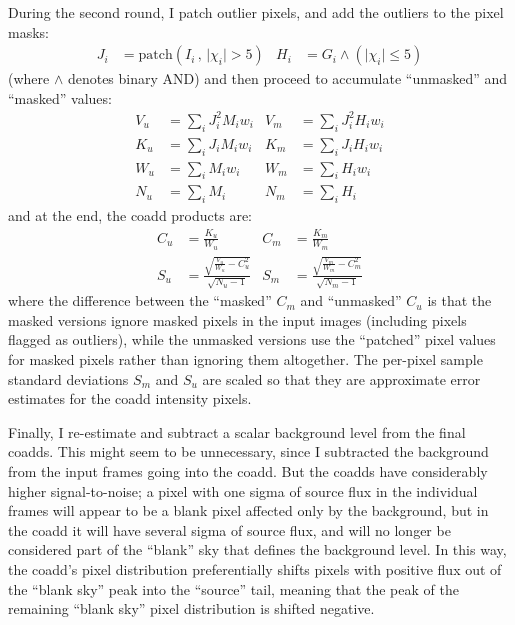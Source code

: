 \documentclass[11pt,preprint]{aastex}
\newcommand{\fimg}[1]{#1}
\newcommand{\img}{\fimg{I}}
\newcommand{\wt}{w}
\newcommand{\mask}{\fimg{M}}
\newcommand{\good}{\fimg{G}}
\newcommand{\covar}{\fimg{V}}
\newcommand{\coacc}{\fimg{K}}
\newcommand{\coadd}{\fimg{C}}
\newcommand{\cowt}{\fimg{W}}
\newcommand{\con}{\fimg{N}}
\newcommand{\copp}{\fimg{S}}
\newcommand{\sgood}{\fimg{H}}
\newcommand{\simg}{\fimg{J}}
\newcommand{\patch}[2]{\textrm{patch}(#1 \, , \, #2)}
\newcommand{\binaryand}{\wedge}
\newcommand{\abs}[1]{\lvert#1\rvert}
\begin{document}
During the second round, I patch outlier pixels, and add the outliers
to the pixel masks:
\begin{align}
\simg_i  &= \patch{\img_i}{\abs{\chi_i} > 5}
&
\sgood_i &= \good_i \binaryand (\abs{\chi_i} \le 5)
\end{align}
(where $\binaryand$ denotes binary AND) and then proceed to accumulate
``unmasked'' and ``masked'' values:
\begin{align}
\covar_u &= \sum_i {\simg}_i^2 \mask_i \wt_i 
&
\covar_m &= \sum_i {\simg}_i^2 \sgood_i \wt_i
\\
\coacc_u &= \sum_i \simg_i     \mask_i \wt_i 
&
\coacc_m &= \sum_i \simg_i     \sgood_i \wt_i
\\
\cowt_u  &= \sum_i             \mask_i \wt_i 
&
\cowt_m  &= \sum_i             \sgood_i \wt_i
\\
\con_u   &= \sum_i             \mask_i       
&
\con_m   &= \sum_i             \sgood_i
\end{align}
and at the end, the coadd products are:
\begin{align}
\coadd_u  &= \frac{\coacc_u}{\cowt_u}
&
\coadd_m &= \frac{\coacc_m}{\cowt_m}
\\
\copp_u   &= \frac{\sqrt{\frac{\covar_u}{\cowt_u} - \coadd_u^2}}{\sqrt{\con_u - 1}}
&
\copp_m   &= \frac{\sqrt{\frac{\covar_m}{\cowt_m} - \coadd_m^2}}{\sqrt{\con_m - 1}}
\end{align}
where the difference between the ``masked'' $\coadd_m$ and
``unmasked'' $\coadd_u$ is that the masked versions ignore masked
pixels in the input images (including pixels flagged as outliers),
while the unmasked versions use the ``patched'' pixel values for
masked pixels rather than ignoring them altogether.  The per-pixel
sample standard deviations $\copp_m$ and $\copp_u$ are scaled so that
they are approximate error estimates for the coadd intensity pixels.


Finally, I re-estimate and subtract a scalar background level from
the final coadds.  This might seem to be unnecessary, since I
subtracted the background from the input frames going into the coadd.
But the coadds have considerably higher signal-to-noise; a pixel with
one sigma of source flux in the individual frames will appear to be a
blank pixel affected only by the background, but in the coadd it will
have several sigma of source flux, and will no longer be considered
part of the ``blank'' sky that defines the background level.  In this
way, the coadd's pixel distribution preferentially shifts pixels with
positive flux out of the ``blank sky'' peak into the ``source'' tail,
meaning that the peak of the remaining ``blank sky'' pixel
distribution is shifted negative.
\end{document}
